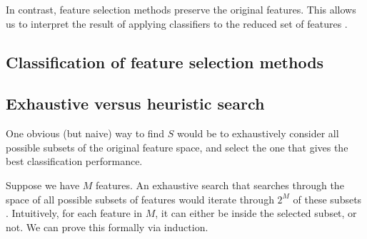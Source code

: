 \documentclass[12pt, twoside, a4paper]{report}
\begin{document}
In contrast, feature selection methods preserve the original features. This allows us to interpret the result of applying classifiers to the reduced set of features \cite{RefWorks:142}.

\subsection{Classification of feature selection methods}

\subsection{Exhaustive versus heuristic search}

One obvious (but naive) way to find $S$ would be to exhaustively consider all possible subsets of the original feature space, and select the one that gives the best classification performance.

Suppose we have $M$ features. An exhaustive search that searches through the space of all possible subsets of features would iterate through $2^M$ of these subsets \cite{RefWorks:182}. Intuitively, for each feature in $M$, it can either be inside the selected subset, or not. We can prove this formally via induction.
\end{document}
